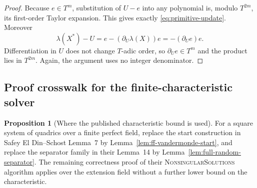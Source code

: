 \documentclass[11pt,a4paper]{article}
\theoremstyle{definition}
\newtheorem{proposition}[theorem]{Proposition}
\theoremstyle{remark}
\begin{document}
\begin{proof}
Because $e\in T^m$, substitution of $U-e$ into any polynomial is, modulo $T^{2m}$, its first-order Taylor expansion.  This gives exactly \eqref{eq:primitive-update}.  Moreover
\[
 \lambda(X^*)-U
 =e-(\partial_U\lambda(X))e
 =-(\partial_U e)e.
\]
Differentiation in $U$ does not change $T$-adic order, so $\partial_Ue\in T^m$ and the product lies in $T^{2m}$.  Again, the argument uses no integer denominator.
\end{proof}

\subsection{Proof crosswalk for the finite-characteristic solver}

\begin{proposition}[Where the published characteristic bound is used]\label{prop:characteristic-crosswalk}
For a square system of quadrics over a finite perfect field, replace the start construction in Safey El Din--Schost Lemma~7 by Lemma~\ref{lem:ff-vandermonde-start}, and replace the separator family in their Lemma~14 by Lemma~\ref{lem:full-random-separator}.  The remaining correctness proof of their \textsc{NonsingularSolutions} algorithm applies over the extension field without a further lower bound on the characteristic.
\end{proposition}
\end{document}
